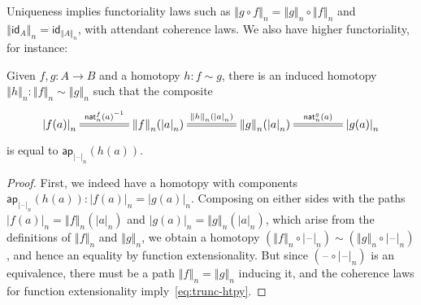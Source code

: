 \documentclass[10pt,a4paper]{article}
\newcommand{\opp}[1]{\mathord{{#1}^{-1}}}
\newcommand{\mapfunc}[1]{\ensuremath{\mathsf{ap}_{#1}}\xspace} %
\let\apfunc\mapfunc
\newcommand{\idfunc}[1][]{\ensuremath{\mathsf{id}_{#1}}\xspace}
\newcommand{\htpy}{\sim}
\newcommand{\trunc}[2]{\mathopen{}\left\Vert #2\right\Vert_{#1}\mathclose{}}
\newcommand{\tproj}[3][]{\mathopen{}\left|#3\right|_{#2}^{#1}\mathclose{}}
\newcommand{\tprojf}[2][]{|\blank|_{#2}^{#1}}
\newcommand{\blank}{\mathord{\hspace{1pt}\text{--}\hspace{1pt}}}
\theoremstyle{definition}
\theoremstyle{remark}
\numberwithin{equation}{section}
\begin{document}
Uniqueness implies functoriality laws such as $\trunc n {g\circ f} = \trunc n g \circ \trunc n f$ and $\trunc n{\idfunc[A]} = \idfunc[\trunc n A]$, with attendant coherence laws.
We also have higher functoriality, for instance:

\begin{lem}\label{thm:trunc-htpy}
  Given $f,g:A\to B$ and a homotopy $h:f\htpy g$, there is an induced homotopy $\trunc n h : \trunc n f \htpy \trunc n g$ such that the composite
  \begin{equation}
    \xymatrix@C=3.6pc{\tproj n{f(a)} \ar@{=}[r]^-{\opp{\mathsf{nat}^f_n(a)}} &
      \trunc n f(\tproj n a) \ar@{=}[r]^-{\trunc n h(\tproj na)} &
      \trunc n g(\tproj n a) \ar@{=}[r]^-{\mathsf{nat}^g_n(a)} &
      \tproj n{g(a)}}\label{eq:trunc-htpy}
  \end{equation}
  is equal to $\apfunc{\tprojf n}(h(a))$.
\end{lem}

\begin{proof}
  First, we indeed have a homotopy with components $\apfunc{\tprojf n}(h(a)) : \tproj n{f(a)} = \tproj n{g(a)}$.
  Composing on either sides with the paths $\tproj n{f(a)} = \trunc n f(\tproj n a)$ and $\tproj n{g(a)} = \trunc n g(\tproj n a)$, which arise from the definitions of $\trunc n f$ and $\trunc ng$, we obtain a homotopy $(\trunc n f \circ \tprojf n) \htpy (\trunc n g \circ \tprojf n)$, and hence an equality by function extensionality.
  But since $(\blank\circ \tprojf n)$ is an equivalence, there must be a path $\trunc nf = \trunc ng$ inducing it, and the coherence laws for function extensionality imply~\eqref{eq:trunc-htpy}.
\end{proof}
\end{document}
